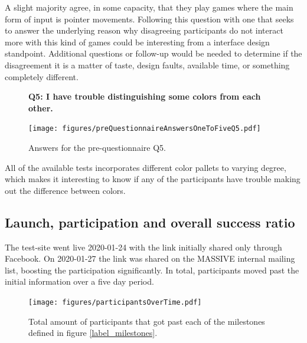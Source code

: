 \documentclass[nofilelist,dvipsnames]{cslthse-msc}
\begin{document}
{        A slight majority agree, in some capacity, that they play games where
        the main form of input is pointer movements. Following this question
        with one that seeks to answer the underlying reason why disagreeing
        participants do not interact more with this kind of games could be
        interesting from a interface design standpoint. Additional questions or
        follow-up would be needed to determine if the disagreement it is a
        matter of taste, design faults, available time, or something completely
        different.

				\begin{figure}[h!]
          \textbf{Q5: I have trouble distinguishing some colors from each other.}
          \begin{center}
            \texttt{[image: figures/preQuestionnaireAnswersOneToFiveQ5.pdf]}
            \vspace{-1cm}
            \caption{Answers for the pre-questionnaire Q5.}
            \vspace{-0.4cm}
          \end{center}
				\end{figure}

        All of the available tests incorporates different color pallets to
        varying degree, which makes it interesting to know if any of the
        participants have trouble making out the difference between colors.
        \vspace{-0.6cm}

			\subsection{Launch, participation and overall success ratio}

        The test-site went live 2020-01-24 with the link initially shared only
        through Facebook. On 2020-01-27 the link was shared on the MASSIVE
        internal mailing list, boosting the participation significantly.
        In total,  participants moved past the
        initial information over a five day period.

				\begin{figure}[h!]
					\centering
					\texttt{[image: figures/participantsOverTime.pdf]}
          \vspace{-0.3cm}
          \caption{
            Total amount of participants that got past each of the milestones
            defined in figure \ref{label_milestones}.
          }
				\end{figure}

}
\end{document}
